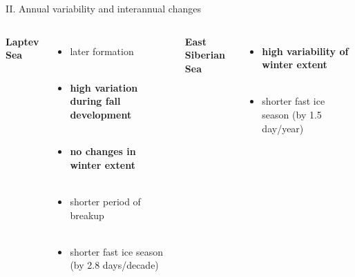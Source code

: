 \documentclass[8pt]{beamer}
\begin{document}
\setwatermark{\fontsize{125pt}{125pt}\selectfont{}}
\begin{frame}[fragile]{II. Annual variability and interannual changes}
\begin{columns}
	\centering
	\textbf{Laptev Sea}\\~\\
	\begin{itemize}
		\item later formation\\~\\
		\item \textbf{high variation during fall development}\\~\\
		\item \textbf{no changes in winter extent}\\~\\
		\item shorter period of breakup\\~\\
		\item shorter fast ice season (by 2.8 days/decade)\\~\\
	\end{itemize}
	
	\centering
	\textbf{East Siberian Sea}\\~\\
	\begin{itemize}
		\item \textbf{high variability of winter extent}\\~\\
		\item shorter fast ice season (by 1.5 day/year) 
	\end{itemize}
\end{columns}
\end{frame}

\end{document}
